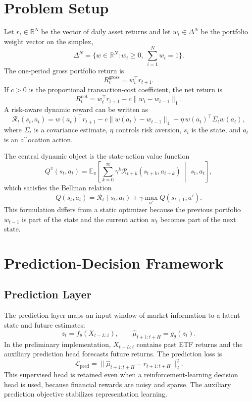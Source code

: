 \documentclass[11pt]{article}
\newcommand{\R}{\mathbb{R}}
\begin{document}
\section{Problem Setup}

Let $r_t \in \R^N$ be the vector of daily asset returns and let $w_t \in \Delta^N$ be the portfolio weight vector on the simplex,
\[
\Delta^N = \{w \in \R^N: w_i \geq 0,\; \sum_{i=1}^N w_i = 1\}.
\]
The one-period gross portfolio return is
\[
R^{\mathrm{gross}}_t = w_t^\top r_{t+1}.
\]
If $c>0$ is the proportional transaction-cost coefficient, the net return is
\[
R^{\mathrm{net}}_t
=
w_t^\top r_{t+1}
-
c\|w_t-w_{t-1}\|_1.
\]
A risk-aware dynamic reward can be written as
\[
\mathcal{R}_t(s_t,a_t)
=
w(a_t)^\top r_{t+1}
-
c\|w(a_t)-w_{t-1}\|_1
-
\eta\, w(a_t)^\top \Sigma_t w(a_t),
\]
where $\Sigma_t$ is a covariance estimate, $\eta$ controls risk aversion, $s_t$ is the state, and $a_t$ is an allocation action.

The central dynamic object is the state-action value function
\[
Q^\pi(s_t,a_t)
=
\mathbb{E}_{\pi}
\left[
\sum_{k=0}^{\infty}\gamma^k
\mathcal{R}_{t+k}(s_{t+k},a_{t+k})
\;\middle|\;
s_t,a_t
\right],
\]
which satisfies the Bellman relation
\[
Q(s_t,a_t)
=
\mathcal{R}_t(s_t,a_t)
+
\gamma \max_{a'} Q(s_{t+1},a').
\]
This formulation differs from a static optimizer because the previous portfolio $w_{t-1}$ is part of the state and the current action $w_t$ becomes part of the next state.

\section{Prediction-Decision Framework}

\subsection{Prediction Layer}

The prediction layer maps an input window of market information to a latent state and future estimates:
\[
z_t = f_\theta(X_{t-L:t}), \qquad
\hat{\mu}_{t+1:t+H} = g_\theta(z_t).
\]
In the preliminary implementation, $X_{t-L:t}$ contains past ETF returns and the auxiliary prediction head forecasts future returns. The prediction loss is
\[
\mathcal{L}_{\mathrm{pred}}
=
\|\hat{\mu}_{t+1:t+H} - r_{t+1:t+H}\|_2^2.
\]
This supervised head is retained even when a reinforcement-learning decision head is used, because financial rewards are noisy and sparse. The auxiliary prediction objective stabilizes representation learning.
\end{document}
